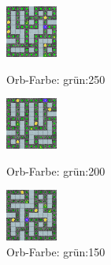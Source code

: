 \begin{figure}[htb!]
    \begin{minipage}{0.3\linewidth}
        \centering
        \includegraphics[scale=1.2]{abb/_envpics/example_green_250}
        \caption*{Orb-Farbe: grün:250}
        \label{fig:pic_chaser_green_250}
    \end{minipage}
    \begin{minipage}{0.3\linewidth}
        \centering
        \includegraphics[scale=1.2]{abb/_envpics/example_green_200}
        \caption*{Orb-Farbe: grün:200}
        \label{fig:pic_chaser_green_200}
    \end{minipage}
    \begin{minipage}{0.3\linewidth}
        \centering
        \includegraphics[scale=1.2]{abb/_envpics/example_green_150}
        \caption*{Orb-Farbe: grün:150}
        \label{fig:pic_chaser_green_150}
    \end{minipage}
\end{figure}

\newpage

